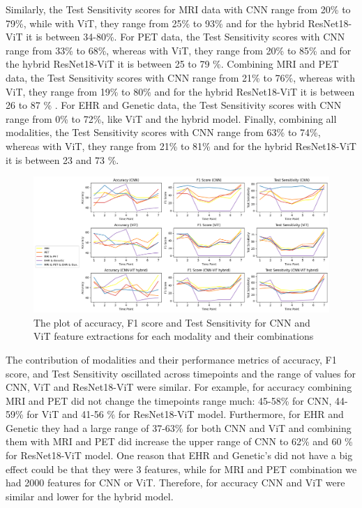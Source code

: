 Similarly, the Test Sensitivity scores for MRI data with CNN range from 20\% to 79\%, while with ViT, they range from 25\% to 93\% and for the hybrid ResNet18-ViT it is between 34-80\%. For PET data, the Test Sensitivity scores with CNN range from 33\% to 68\%, whereas with ViT, they range from 20\% to 85\% and for the hybrid ResNet18-ViT it is between 25 to 79 \%. Combining MRI and PET data, the Test Sensitivity scores with CNN range from 21\% to 76\%, whereas with ViT, they range from 19\% to 80\% and for the hybrid ResNet18-ViT it is between 26 to 87 \% . For EHR and Genetic data, the Test Sensitivity scores with CNN range from 0\% to 72\%, like ViT and the hybrid model. Finally, combining all modalities, the Test Sensitivity scores with CNN range from 63\% to 74\%, whereas with ViT, they range from 21\% to 81\% and for the hybrid ResNet18-ViT it is between 23 and 73 \%. 
\begin{figure}
    \centering
    \includegraphics[width=1\linewidth]{figs/Picture17_1.png}
    \caption{The plot of accuracy, F1 score and Test Sensitivity for CNN and ViT feature extractions for each modality and their combinations }
    \label{fig:ADprogression}
\end{figure}
The contribution of modalities and their performance metrics of accuracy, F1 score, and Test Sensitivity oscillated across timepoints and the range of values for CNN, ViT and ResNet18-ViT were similar. For example, for accuracy combining MRI and PET did not change the timepoints range much:  45-58\% for CNN, 44-59\% for ViT and 41-56 \% for ResNet18-ViT model. Furthermore, for EHR and Genetic they had a large range of 37-63\% for both CNN and ViT and combining them with MRI and PET did increase the upper range of CNN to 62\% and 60 \% for ResNet18-ViT model. One reason that EHR and Genetic’s did not have a big effect could be that they were 3 features, while for MRI and PET combination we had 2000 features for CNN or ViT. Therefore, for accuracy CNN and ViT were similar and lower for the hybrid model.  

